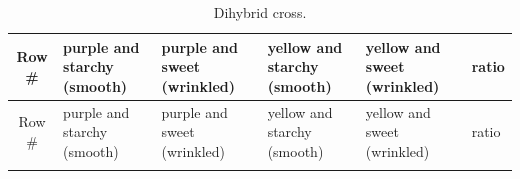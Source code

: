 \documentclass[]{book}
\begin{document}
\begin{longtable}[]{@{}clllll@{}}
\caption{\label{tab:di} Dihybrid cross.}\tabularnewline
\toprule
\begin{minipage}[b]{0.04\columnwidth}\centering
Row \#\strut
\end{minipage} & \begin{minipage}[b]{0.19\columnwidth}\raggedright
purple and starchy (smooth)\strut
\end{minipage} & \begin{minipage}[b]{0.19\columnwidth}\raggedright
purple and sweet (wrinkled)\strut
\end{minipage} & \begin{minipage}[b]{0.19\columnwidth}\raggedright
yellow and starchy (smooth)\strut
\end{minipage} & \begin{minipage}[b]{0.19\columnwidth}\raggedright
yellow and sweet (wrinkled)\strut
\end{minipage} & \begin{minipage}[b]{0.03\columnwidth}\raggedright
ratio\strut
\end{minipage}\tabularnewline
\midrule
\endfirsthead
\toprule
\begin{minipage}[b]{0.04\columnwidth}\centering
Row \#\strut
\end{minipage} & \begin{minipage}[b]{0.19\columnwidth}\raggedright
purple and starchy (smooth)\strut
\end{minipage} & \begin{minipage}[b]{0.19\columnwidth}\raggedright
purple and sweet (wrinkled)\strut
\end{minipage} & \begin{minipage}[b]{0.19\columnwidth}\raggedright
yellow and starchy (smooth)\strut
\end{minipage} & \begin{minipage}[b]{0.19\columnwidth}\raggedright
yellow and sweet (wrinkled)\strut
\end{minipage} & \begin{minipage}[b]{0.03\columnwidth}\raggedright
ratio\strut
\end{minipage}\tabularnewline
\midrule
\endhead
\begin{minipage}[t]{0.04\columnwidth}\centering
1\strut
\end{minipage} & \begin{minipage}[t]{0.19\columnwidth}\raggedright
\strut
\end{minipage} & \begin{minipage}[t]{0.19\columnwidth}\raggedright

\end{minipage}
\end{longtable}
\end{document}
